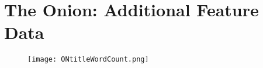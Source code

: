 \documentclass [12 pt] {report}
\begin{document}
\section{The Onion: Additional Feature Data}
\begin{figure} [h]
	\centering
	\caption{Onion Title Word Count}
	\begin{minipage}{.5\textwidth}
	\centering
	\texttt{[image: ONtitleWordCount.png]}
	\label{Onion Title Word Count}
	\end{minipage}%
	\begin{minipage}{.5\textwidth}
	\begin{table}[H]
	\scriptsize
		\label{table: Onion Comparison: Title Word Count}
	\end{table}
	\end{minipage}
\end{figure}
\FloatBarrier
\vspace{-10mm}
\end{document}
